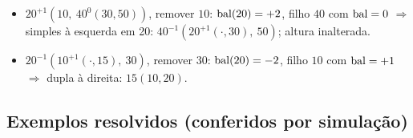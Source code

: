 \begin{exemplo}\leavevmode
\begin{itemize}
  \item $20^{+1}(10,\ 40^{0}(30,50))$, remover $10$: $\operatorname{bal}(20)=+2$, filho $40$ com $\operatorname{bal}=0$ $\Rightarrow$ simples à esquerda em 20: $40^{-1}(20^{+1}(\cdot,30),\ 50)$; altura inalterada.
  \item $20^{-1}(10^{+1}(\cdot,15),\ 30)$, remover $30$: $\operatorname{bal}(20)=-2$, filho $10$ com $\operatorname{bal}=+1$ $\Rightarrow$ dupla à direita: $15(10,20)$.
\end{itemize}
\end{exemplo}

\subsection{Exemplos resolvidos (conferidos por simulação)}
